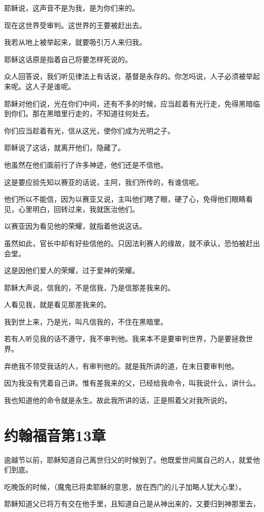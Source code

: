 \documentclass[12pt,oneside]{book}
\begin{document}
耶稣说，这声音不是为我，是为你们来的。

现在这世界受审判。这世界的王要被赶出去。

我若从地上被举起来，就要吸引万人来归我。

耶稣这话原是指着自己将要怎样死说的。

众人回答说，我们听见律法上有话说，基督是永存的。你怎吗说，人子必须被举起来呢。这人子是谁呢。

耶稣对他们说，光在你们中间，还有不多的时候，应当趁着有光行走，免得黑暗临到你们。那在黑暗里行走的，不知道往何处去。

你们应当趁着有光，信从这光，使你们成为光明之子。

耶稣说了这话，就离开他们，隐藏了。

他虽然在他们面前行了许多神迹，他们还是不信他。

这是要应验先知以赛亚的话说，主阿，我们所传的，有谁信呢。

他们所以不能信，因为以赛亚又说，主叫他们瞎了眼，硬了心，免得他们眼睛看见，心里明白，回转过来，我就医治他们。

以赛亚因为看见他的荣耀，就指着他说这话。

虽然如此，官长中却有好些信他的。只因法利赛人的缘故，就不承认，恐怕被赶出会堂。

这是因他们爱人的荣耀，过于爱神的荣耀。

耶稣大声说，信我的，不是信我，乃是信那差我来的。

人看见我，就是看见那差我来的。

我到世上来，乃是光，叫凡信我的，不住在黑暗里。

若有人听见我的话不遵守，我不审判他。我来本不是要审判世界，乃是要拯救世界。

弃绝我不领受我话的人，有审判他的。就是我所讲的道，在末日要审判他。

因为我没有凭着自己讲。惟有差我来的父，已经给我命令，叫我说什么，讲什么。

我也知道他的命令就是永生。故此我所讲的话，正是照着父对我所说的。

\chapter{约翰福音第13章}
逾越节以前，耶稣知道自己离世归父的时候到了。他既爱世间属自己的人，就爱他们到底。

吃晚饭的时候，（魔鬼已将卖耶稣的意思，放在西门的儿子加略人犹大心里）。

耶稣知道父已将万有交在他手里，且知道自己是从神出来的，又要归到神那里去，
\end{document}
